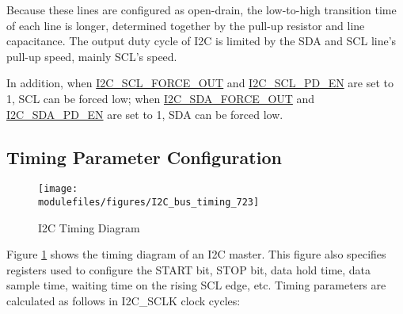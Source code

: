 \documentclass[main\_\_EN.tex]{subfiles}
\begin{document}
Because these lines are configured as open-drain, the low-to-high transition time of each line is longer, determined together by the pull-up resistor and line capacitance. The output duty cycle of I2C is limited by the SDA and SCL line's pull-up speed, mainly SCL's speed.

In addition, when \hyperref[fielddesc:I2CSCLFORCEOUT]{I2C\_SCL\_FORCE\_OUT} and \hyperref[fielddesc:I2CSCLPDEN]{I2C\_SCL\_PD\_EN} are set to 1, SCL can be forced low; when \hyperref[fielddesc:I2CSDAFORCEOUT]{I2C\_SDA\_FORCE\_OUT} and \hyperref[fielddesc:I2CSDAPDEN]{I2C\_SDA\_PD\_EN} are set to 1, SDA can be forced low.


\subsection{Timing Parameter Configuration}\label{subsec:i2c-timing-para}
\begin{figure}[H]
    \centering
    \texttt{[image: \\modulefiles/figures/I2C\_bus\_timing\_723]}
    \caption{I2C Timing Diagram}
    \label{fig:i2c-bus-timing}
\end{figure}

Figure \ref{fig:i2c-bus-timing} shows the timing diagram of an I2C master. This figure also specifies registers used to configure the START bit, STOP bit, data hold time, data sample time, waiting time on the rising SCL edge, etc. Timing parameters are calculated as follows in I2C\_SCLK clock cycles:
\end{document}
